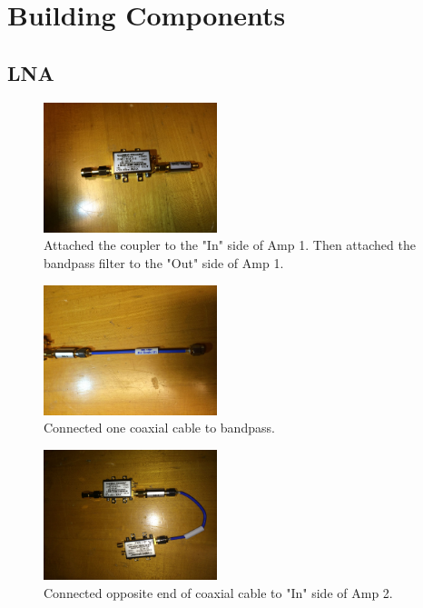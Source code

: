 \documentclass[11pt]{article} %
\begin{document}
\section{Building Components}


\subsection{LNA}

\begin{figure}
  \centering
  \caption{Attached the coupler to the "In" side of Amp 1. Then attached the bandpass filter to the "Out" side of Amp 1. }
  \includegraphics[width=0.45\textwidth]{lna/01.jpeg}
\end{figure}


\begin{figure}
  \centering
  \caption{Connected one coaxial cable to bandpass. }
  \includegraphics[width=0.45\textwidth]{lna/02.jpeg}
\end{figure}


\begin{figure}
  \centering
  \caption{Connected opposite end of coaxial cable to "In" side of Amp 2.  }
  \includegraphics[width=0.45\textwidth]{lna/03.jpeg}
\end{figure}
\end{document}
